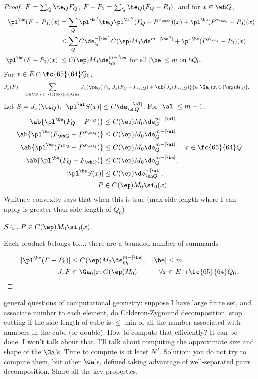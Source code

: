 \begin{proof}
$F=\sum_Q \te_Q F_Q$, $F-P_0=\sum_Q \te_Q(F_Q-P_0)$, and for $x\in \wh Q$, 
\begin{align}
\pl^\be (F-P_0)(x) & = \sum_Q \pl^{\be'} \te_Q \pl^{\be''} (F_Q-P^{x_{\wh Q}})(x) + \pl^{\be}(P^{x_{\wh Q}} -P_0)(x)\\
&\le \sum_Q C\de_Q^{-|\be'|} C(\ep) M_0 \de^{m-|\be''|} + \pl^{\be}(P^{x_{\wh Q}} -P_0)(x)\\
|\pl^\be (F-P_0)(x)| 
&\le C(\ep) M_0 \de_{Q_0}^{m-|\be|}\text{ for all }|\be|\le m\text{ on }5Q_0.
\end{align}
For $x\in E\cap \fc{65}{64}Q_0$,
\begin{align}
J_x(F) &= 
\sum_{Q\in CZ\text{ s.t. } \fc{65}{64}Q\ni x} J_x(\te_Q) \odot_x J_x(F_Q-F_{\wh Q})
+ \ub{J_x(F_{\wh Q})}{\in \Ga_0(x,C(\ep)M_0)}.
\end{align}
Let $S=J_x(\te_Q)$. $|\pl^\al S(x)|\le C\de_{\wh Q}^{-|\al|}$. 
For $|\al|\le m-1$, 
\begin{align}
\ab{\pl^\be(F_Q-P^{x_{Q}})} &\le C(\ep) M_0 \de_Q^{m-|\al|}
\\
\ab{\pl^\be(F_{\wh Q}-P^{x_{\wh Q}})} &\le C(\ep) M_0 \de_Q^{m-|\al|}\\
\ab{\pl^\be(P^{x_{Q}}-P^{x_{\wh Q}})} &\le C(\ep) M_0 \de_Q^{m-|\al|}, &x\in \fc{65}{64}Q\\
\ab{\pl^\be(F_Q-F_{\wh Q})} &\le C(\ep) M_0 \de_Q^{m-|\be|},\\
|\pl^\be S(x) |&\le C(\ep) \de_{\wh Q}^{-|\al|},\\
P&\in C(\ep) M_0\si_0(x).
\end{align}
Whitney convexity says that when this is true (max side length where I can apply is greater than side length of $Q_0$)

$S\odot_x P \in C(\ep) M_0\si_0(x)$. 

Each product belongs to...; there are a bounded number of summands

\begin{align}
|\pl^\be (F-P_0)|&\le  C(\ep) M_0 \de_{Q_0}^{m-|\be|}, & |\be|&\le m\\
J_x F &\in \Ga_0(x,C(\ep)M_0) &\forall x&\in E\cap \fc{65}{64}Q_0.
\end{align}
% 
\end{proof}
general questions of computational geometry: suppose I have large finite set, and associate number to each element, do Calderon-Zygmund decomposition, stop cutting if the side length of cube is $\le$ min of all the number associated with numbers in the cube (or double). How to compute that efficiently? It can be done. I won't talk about that. I'll talk about computing the approximate size and shape of the $\Ga$'s. Time to compute is at least $N^2$. Solution: you do not try to compute them, but other $\Ga$'s, defined taking advantage of well-separated pairs decomposition. Share all the key properties.
